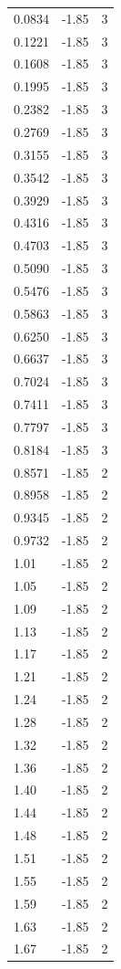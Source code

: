 \begin{longtable}{lrr}
  0.0834 & -1.85 & 3 \\
  0.1221 & -1.85 & 3 \\
  0.1608 & -1.85 & 3 \\
  0.1995 & -1.85 & 3 \\
  0.2382 & -1.85 & 3 \\
  0.2769 & -1.85 & 3 \\
  0.3155 & -1.85 & 3 \\
  0.3542 & -1.85 & 3 \\
  0.3929 & -1.85 & 3 \\
  0.4316 & -1.85 & 3 \\
  0.4703 & -1.85 & 3 \\
  0.5090 & -1.85 & 3 \\
  0.5476 & -1.85 & 3 \\
  0.5863 & -1.85 & 3 \\
  0.6250 & -1.85 & 3 \\
  0.6637 & -1.85 & 3 \\
  0.7024 & -1.85 & 3 \\
  0.7411 & -1.85 & 3 \\
  0.7797 & -1.85 & 3 \\
  0.8184 & -1.85 & 3 \\
  0.8571 & -1.85 & 2 \\
  0.8958 & -1.85 & 2 \\
  0.9345 & -1.85 & 2 \\
  0.9732 & -1.85 & 2 \\
  1.01 & -1.85 & 2 \\
  1.05 & -1.85 & 2 \\
  1.09 & -1.85 & 2 \\
  1.13 & -1.85 & 2 \\
  1.17 & -1.85 & 2 \\
  1.21 & -1.85 & 2 \\
  1.24 & -1.85 & 2 \\
  1.28 & -1.85 & 2 \\
  1.32 & -1.85 & 2 \\
  1.36 & -1.85 & 2 \\
  1.40 & -1.85 & 2 \\
  1.44 & -1.85 & 2 \\
  1.48 & -1.85 & 2 \\
  1.51 & -1.85 & 2 \\
  1.55 & -1.85 & 2 \\
  1.59 & -1.85 & 2 \\
  1.63 & -1.85 & 2 \\
  1.67 & -1.85 & 2 \\

\end{longtable}
